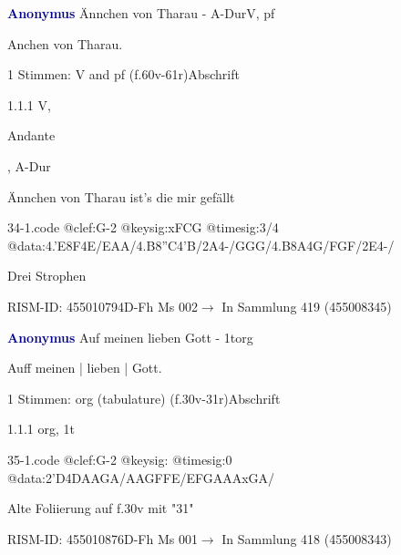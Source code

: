\documentclass[twocolumn]{book}
\begin{document}
\par \vspace{7pt} \textcolor{darkblue}{\textbf{Anonymus  }}\hfillplus{\textbf{[34]}}\newline Ännchen von Tharau - A-Dur\newline V, pf
\par \begin{itshape}[heading, f.60v:] Anchen von Tharau.\end{itshape} 
\par \textcolor{darkblue}{}  1 Stimmen: V and pf  (f.60v-61r)\newline Abschrift
\par 1.1.1  V, \begin{itshape}Andante\end{itshape}, A-Dur\newline \begin{footnotesize} Ännchen von Tharau ist's die mir gefällt \end{footnotesize}  
\begin{filecontents*}{34-1.code}
@clef:G-2
@keysig:xFCG
@timesig:3/4
@data:4.'E8F4E/EAA/4.B8''C4'B/2A4-/GGG/4.B8A4G/FGF/2E4-/
\end{filecontents*}
\newline
%
\par Drei Strophen
\par RISM-ID: 455010794\newline D-Fh  Ms 002\newline $\rightarrow$ In Sammlung 419 (455008345)
      
\par \vspace{7pt} \textcolor{darkblue}{\textbf{Anonymus  }}\hfillplus{\textbf{[35]}}\newline Auf meinen lieben Gott - 1t\newline org
\par \begin{itshape}[f.30v, at left:] Auff meinen | lieben | Gott.\end{itshape} 
\par \textcolor{darkblue}{}  1 Stimmen: org (tabulature)  (f.30v-31r)\newline Abschrift
\par 1.1.1  org, 1t  
\begin{filecontents*}{35-1.code}
@clef:G-2
@keysig:
@timesig:0
@data:2'D4DAAGA/AAGFFE/EFGAAAxGA/
\end{filecontents*}
\newline
%
\par Alte Foliierung auf f.30v mit "31"
\par RISM-ID: 455010876\newline D-Fh  Ms 001\newline $\rightarrow$ In Sammlung 418 (455008343)
      
\end{document}
